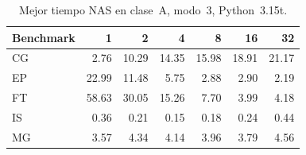 \begin{table}[htbp]
\centering
\small
\begin{tabular}{lrrrrrr}
\hline
Benchmark & 1 & 2 & 4 & 8 & 16 & 32 \\
\hline
CG & 2.76 & 10.29 & 14.35 & 15.98 & 18.91 & 21.17 \\
EP & 22.99 & 11.48 & 5.75 & 2.88 & 2.90 & 2.19 \\
FT & 58.63 & 30.05 & 15.26 & 7.70 & 3.99 & 4.18 \\
IS & 0.36 & 0.21 & 0.15 & 0.18 & 0.24 & 0.44 \\
MG & 3.57 & 4.34 & 4.14 & 3.96 & 3.79 & 4.56 \\
\hline
\end{tabular}
\caption{Mejor tiempo NAS en clase~A, modo~3, Python~3.15t.}
\label{tab:resultados-a-mode3-tiempos}
\end{table}
